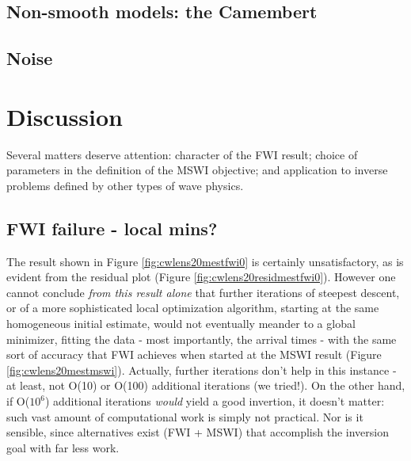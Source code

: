 

\subsection{Non-smooth models: the Camembert}

\subsection{Noise}



\section{Discussion}
Several matters deserve attention: character of the FWI result; choice of parameters in the
definition of the MSWI objective; and application to inverse problems
defined by other types of wave physics.

\subsection{FWI failure - local mins?}
The result shown in Figure \ref{fig:cwlens20mestfwi0} is certainly
unsatisfactory, as is evident from the residual plot (Figure
\ref{fig:cwlens20residmestfwi0}). However one cannot conclude {\em
  from this result alone} that further
iterations of steepest descent, or of a more sophisticated local
optimization algorithm, starting at the same homogeneous initial
estimate, would not eventually meander to a global
minimizer, fitting the data - most importantly, the arrival times -
with the same sort of accuracy that FWI achieves when started at the
MSWI result (Figure \ref{fig:cwlens20mestmswi}). Actually, further iterations don't help
in this instance - at least, not O(10) or O(100) additional
iterations (we tried!). On the other hand, if O($10^6$)
additional iterations {\em would} yield a good invertion, it doesn't matter: such vast amount of computational
work is simply not practical. Nor is it sensible, since alternatives
exist (FWI + MSWI) that accomplish the inversion goal with far less
work.


